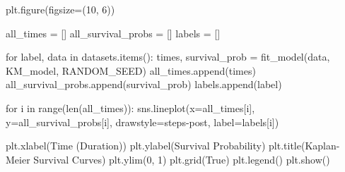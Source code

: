 \documentclass[
  letterpaper,
  DIV=11,
  numbers=noendperiod]{scrartcl}
\newenvironment{Shaded}{\begin{snugshade}}{\end{snugshade}}
\newcommand{\BuiltInTok}[1]{\textcolor[rgb]{0.00,0.23,0.31}{#1}}
\newcommand{\ControlFlowTok}[1]{\textcolor[rgb]{0.00,0.23,0.31}{#1}}
\newcommand{\DecValTok}[1]{\textcolor[rgb]{0.68,0.00,0.00}{#1}}
\newcommand{\KeywordTok}[1]{\textcolor[rgb]{0.00,0.23,0.31}{#1}}
\newcommand{\NormalTok}[1]{\textcolor[rgb]{0.00,0.23,0.31}{#1}}
\newcommand{\OperatorTok}[1]{\textcolor[rgb]{0.37,0.37,0.37}{#1}}
\newcommand{\StringTok}[1]{\textcolor[rgb]{0.13,0.47,0.30}{#1}}
\newcommand{\VariableTok}[1]{\textcolor[rgb]{0.07,0.07,0.07}{#1}}
\begin{document}
\begin{Shaded}
\begin{Highlighting}[]
\NormalTok{plt.figure(figsize}\OperatorTok{=}\NormalTok{(}\DecValTok{10}\NormalTok{, }\DecValTok{6}\NormalTok{))}

\NormalTok{all\_times }\OperatorTok{=}\NormalTok{ []}
\NormalTok{all\_survival\_probs }\OperatorTok{=}\NormalTok{ []}
\NormalTok{labels }\OperatorTok{=}\NormalTok{ []}

\ControlFlowTok{for}\NormalTok{ label, data }\KeywordTok{in}\NormalTok{ datasets.items():}
\NormalTok{    times, survival\_prob }\OperatorTok{=}\NormalTok{ fit\_model(data, KM\_model, RANDOM\_SEED)}
\NormalTok{    all\_times.append(times)}
\NormalTok{    all\_survival\_probs.append(survival\_prob)}
\NormalTok{    labels.append(label)}

\ControlFlowTok{for}\NormalTok{ i }\KeywordTok{in} \BuiltInTok{range}\NormalTok{(}\BuiltInTok{len}\NormalTok{(all\_times)):}
\NormalTok{    sns.lineplot(x}\OperatorTok{=}\NormalTok{all\_times[i], y}\OperatorTok{=}\NormalTok{all\_survival\_probs[i], drawstyle}\OperatorTok{=}\StringTok{\textquotesingle{}steps{-}post\textquotesingle{}}\NormalTok{, label}\OperatorTok{=}\NormalTok{labels[i])}

\NormalTok{plt.xlabel(}\StringTok{\textquotesingle{}Time (Duration)\textquotesingle{}}\NormalTok{)}
\NormalTok{plt.ylabel(}\StringTok{\textquotesingle{}Survival Probability\textquotesingle{}}\NormalTok{)}
\NormalTok{plt.title(}\StringTok{\textquotesingle{}Kaplan{-}Meier Survival Curves\textquotesingle{}}\NormalTok{)}
\NormalTok{plt.ylim(}\DecValTok{0}\NormalTok{, }\DecValTok{1}\NormalTok{)}
\NormalTok{plt.grid(}\VariableTok{True}\NormalTok{)}
\NormalTok{plt.legend()}
\NormalTok{plt.show()}
\end{Highlighting}
\end{Shaded}
\end{document}
